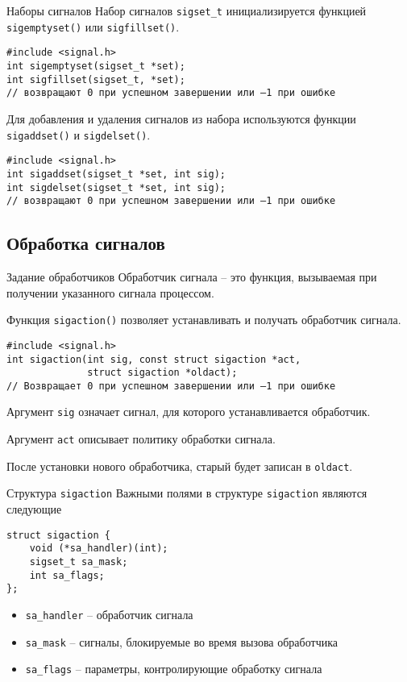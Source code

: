 \documentclass{beamer}
\begin{document}
\begin{frame}[fragile]{Наборы сигналов}
    Набор сигналов \texttt{sigset\_t} инициализируется функцией \texttt{sigemptyset()} или \texttt{sigfillset()}.
\begin{verbatim}
#include <signal.h>
int sigemptyset(sigset_t *set);
int sigfillset(sigset_t, *set);
// возвращают 0 при успешном завершении или –1 при ошибке
\end{verbatim}

    Для добавления и удаления сигналов из набора используются функции \texttt{sigaddset()} и \texttt{sigdelset()}.
\begin{verbatim}
#include <signal.h>
int sigaddset(sigset_t *set, int sig);
int sigdelset(sigset_t *set, int sig);
// возвращают 0 при успешном завершении или –1 при ошибке
\end{verbatim}
\end{frame}

\subsection{Обработка сигналов}

\begin{frame}[fragile]{Задание обработчиков}
    Обработчик сигнала -- это функция, вызываемая при получении указанного сигнала процессом.
    
    Функция \texttt{sigaction()} позволяет устанавливать и получать обработчик сигнала.
\begin{verbatim}
#include <signal.h>
int sigaction(int sig, const struct sigaction *act, 
              struct sigaction *oldact);
// Возвращает 0 при успешном завершении или –1 при ошибке
\end{verbatim}

    Аргумент \texttt{sig} означает сигнал, для которого устанавливается обработчик.
    
    Аргумент \texttt{act} описывает политику обработки сигнала.
    
    После установки нового обработчика, старый будет записан в \texttt{oldact}.
\end{frame}

\begin{frame}[fragile]{Структура \texttt{sigaction}}
    Важными полями в структуре \texttt{sigaction} являются следующие
\begin{verbatim}
struct sigaction {
    void (*sa_handler)(int);
    sigset_t sa_mask;
    int sa_flags;
};
\end{verbatim}
    
    \begin{itemize}
        \item \texttt{sa\_handler} -- обработчик сигнала
        \item \texttt{sa\_mask} --  сигналы, блокируемые во время вызова обработчика 
        \item \texttt{sa\_flags} -- параметры, контролирующие обработку сигнала
    \end{itemize}
\end{frame}
\end{document}
